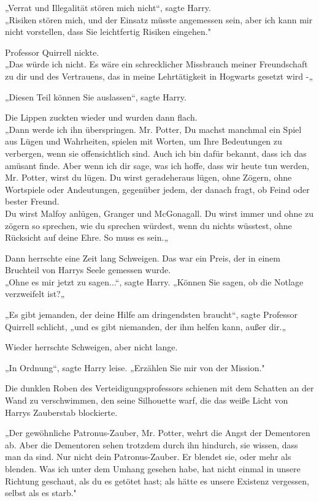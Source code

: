 {„Verrat und Illegalität stören mich nicht“, sagte Harry.\\ „Risiken stören mich, und der Einsatz müsste angemessen sein, aber ich kann mir nicht vorstellen, dass Sie leichtfertig Risiken eingehen."

Professor Quirrell nickte.\\ „Das würde ich nicht. Es wäre ein schrecklicher Missbrauch meiner Freundschaft zu dir und des Vertrauens, das in meine Lehrtätigkeit in Hogwarts gesetzt wird -„

„Diesen Teil können Sie auslassen“, sagte Harry.

Die Lippen zuckten wieder und wurden dann flach.\\ „Dann werde ich ihn überspringen. Mr. Potter, Du machst manchmal ein Spiel aus Lügen und Wahrheiten, spielen mit Worten, um Ihre Bedeutungen zu verbergen, wenn sie offensichtlich sind. Auch ich bin dafür bekannt, dass ich das amüsant finde. Aber wenn ich dir sage, was ich hoffe, dass wir heute tun werden, Mr. Potter, wirst du lügen. Du wirst geradeheraus lügen, ohne Zögern, ohne Wortspiele oder Andeutungen, gegenüber jedem, der danach fragt, ob Feind oder bester Freund.\\ Du wirst Malfoy anlügen, Granger und McGonagall. Du wirst immer und ohne zu zögern so sprechen, wie du sprechen würdest, wenn du nichts wüsstest, ohne Rücksicht auf deine Ehre. So muss es sein.„

Dann herrschte eine Zeit lang Schweigen. Das war ein Preis, der in einem Bruchteil von Harrys Seele gemessen wurde.\\ „Ohne es mir jetzt zu sagen...“, sagte Harry. „Können Sie sagen, ob die Notlage verzweifelt ist?„

„Es gibt jemanden, der deine Hilfe am dringendsten braucht“, sagte Professor Quirrell schlicht, „und es gibt niemanden, der ihm helfen kann, außer dir.„

Wieder herrschte Schweigen, aber nicht lange.

„In Ordnung“, sagte Harry leise. „Erzählen Sie mir von der Mission."

Die dunklen Roben des Verteidigungsprofessors schienen mit dem Schatten an der Wand zu verschwimmen, den seine Silhouette warf, die das weiße Licht von Harrys Zauberstab blockierte.

„Der gewöhnliche Patronus-Zauber, Mr. Potter, wehrt die Angst der Dementoren ab. Aber die Dementoren sehen trotzdem durch ihn hindurch, sie wissen, dass man da sind. Nur nicht dein Patronus-Zauber. Er blendet sie, oder mehr als blenden. Was ich unter dem Umhang gesehen habe, hat nicht einmal in unsere Richtung geschaut, als du es getötet hast; als hätte es unsere Existenz vergessen, selbst als es starb."

}
